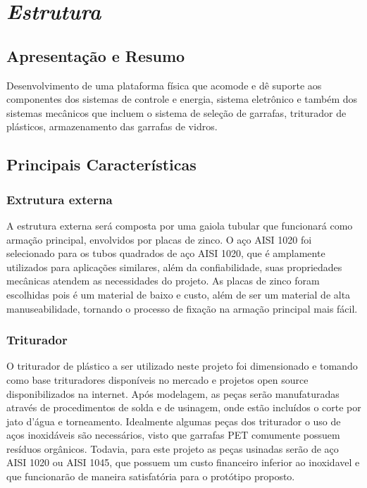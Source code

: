 \section{\textit{Estrutura}}

\subsection{Apresentação e Resumo}
    Desenvolvimento de uma plataforma física que acomode e dê suporte aos componentes dos sistemas de controle e energia, sistema eletrônico e também dos sistemas mecânicos que incluem o sistema de seleção de garrafas, triturador de plásticos, armazenamento das garrafas de vidros.

\subsection{Principais Características}

\subsubsection{Extrutura externa}
    A estrutura externa será composta por uma gaiola tubular que funcionará como armação  principal, envolvidos por placas de zinco. O aço AISI 1020 foi selecionado para os tubos quadrados de aço AISI 1020, que é amplamente utilizados para aplicações similares, além da confiabilidade, suas propriedades mecânicas atendem as necessidades do projeto. As placas de zinco foram escolhidas pois é um material de baixo e custo, além de ser um material de alta manuseabilidade, tornando o processo de fixação na armação principal mais fácil.

\subsubsection{Triturador}
    O triturador de plástico a ser utilizado neste projeto foi dimensionado e tomando como base trituradores disponíveis no mercado e projetos open source disponibilizados na internet. Após modelagem, as peças serão manufaturadas através de procedimentos de solda e de usinagem, onde estão incluídos o corte por jato d'água e torneamento. Idealmente algumas peças dos triturador o uso de aços inoxidáveis são necessários, visto que garrafas PET comumente possuem resíduos orgânicos. Todavia, para este projeto as peças usinadas serão de aço AISI 1020 ou AISI 1045, que possuem um custo financeiro inferior ao inoxidavel e que funcionarão de maneira satisfatória para o protótipo proposto.

